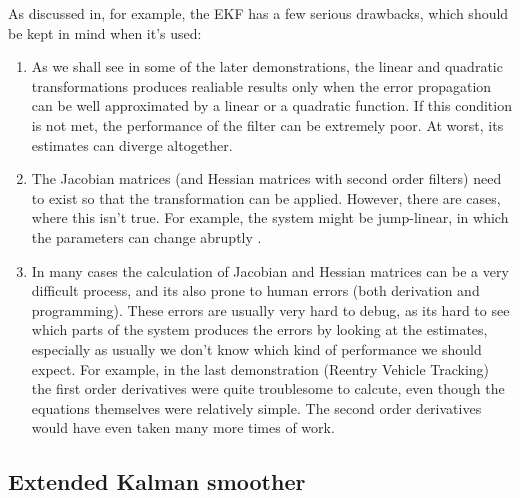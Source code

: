 As discussed in, for example, \citep{Julier+Uhlmann:2004} the EKF has a
few serious drawbacks, which should be kept in mind when it's used:
%
\begin{enumerate}
\item As we shall see in some of the later demonstrations, the linear
  and quadratic transformations produces realiable results only when
  the error propagation can be well approximated by a linear or a
  quadratic function. If this condition is not met, the performance of
  the filter can be extremely poor. At worst, its estimates can
  diverge altogether.
\item The Jacobian matrices (and Hessian matrices with second order
  filters) need to exist so that the transformation can be applied.
  However, there are cases, where this isn't true. For example, the
  system might be jump-linear, in which the parameters can change
  abruptly \citep{Julier+Uhlmann:2004}.
\item In many cases the calculation of Jacobian and Hessian matrices
  can be a very difficult process, and its also prone to human errors
  (both derivation and programming). These errors are usually very
  hard to debug, as its hard to see which parts of the system produces
  the errors by looking at the estimates, especially as usually we
  don't know which kind of performance we should expect. For example,
  in the last demonstration (Reentry Vehicle Tracking) the first order
  derivatives were quite troublesome to calcute, even though the
  equations themselves were relatively simple. The second order
  derivatives would have even taken many more times of work.
\end{enumerate}
%
\label{page:ekf_problems}


  

%
\subsection{Extended Kalman smoother}
%

